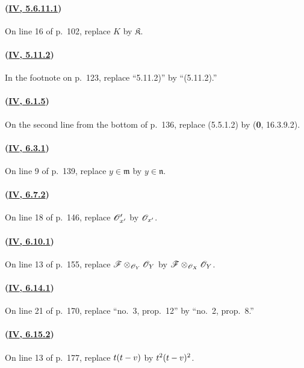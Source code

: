\paragraph{({\texorpdfstring{\protect\hyperref[IV.5.6.11.1]{\textbf{IV}, 5.6.11.1}}{IV, 5.6.11.1}})}
On line 16 of p.~102, replace $K$ by $\mathfrak K$.

\paragraph{({\texorpdfstring{\protect\hyperref[IV.5.11.2]{\textbf{IV}, 5.11.2}}{IV, 5.11.2}})}
In the footnote on p.~123, replace ``5.11.2)'' by ``(5.11.2).''

\paragraph{({\texorpdfstring{\protect\hyperref[IV.6.1.5]{\textbf{IV}, 6.1.5}}{IV, 6.1.5}})}
On the second line from the bottom of p.~136, replace (5.5.1.2) by
(\textbf{0}, 16.3.9.2).

\paragraph{({\texorpdfstring{\protect\hyperref[IV.6.3.1]{\textbf{IV}, 6.3.1}}{IV, 6.3.1}})}
On line 9 of p.~139, replace $y\in\mathfrak m$ by $y\in\mathfrak n$.

\paragraph{({\texorpdfstring{\protect\hyperref[IV.6.7.2]{\textbf{IV}, 6.7.2}}{IV, 6.7.2}})}
On line 18 of p.~146, replace $\mathscr{O}'_{x'}$ by $\mathscr{O}_{x'}$.

\paragraph{({\texorpdfstring{\protect\hyperref[IV.6.10.1]{\textbf{IV}, 6.10.1}}{IV, 6.10.1}})}
On line 13 of p.~155, replace
$\mathscr{F}\otimes_{\mathscr{O}_Y}\mathscr{O}_Y$ by
$\mathscr{F}\otimes_{\mathscr{O}_X}\mathscr{O}_Y$.

\paragraph{({\texorpdfstring{\protect\hyperref[IV.6.14.1]{\textbf{IV}, 6.14.1}}{IV, 6.14.1}})}
On line 21 of p.~170, replace ``no.~3, prop.~12'' by
``no.~2, prop.~8.''

\paragraph{({\texorpdfstring{\protect\hyperref[IV.6.15.2]{\textbf{IV}, 6.15.2}}{IV, 6.15.2}})}
On line 13 of p.~177, replace $t(t- v)$ by $t^2(t- v)^2$.


